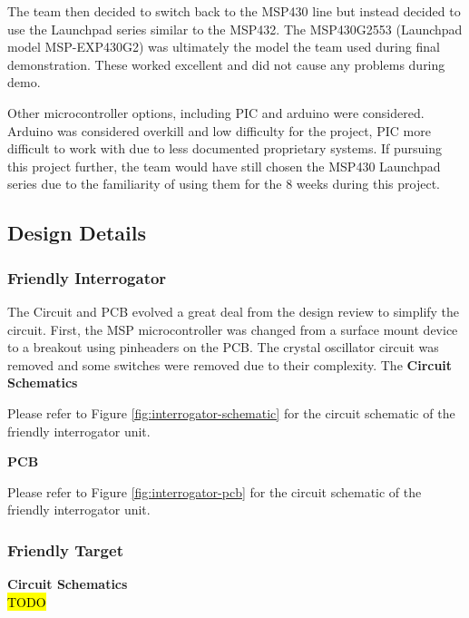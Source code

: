 \documentclass[letterpaper,10pt]{article}
\begin{document}
\begin{spacing}{1.15}
The team then decided to switch back to the MSP430 line but instead decided to use the Launchpad series similar to the MSP432. The MSP430G2553 (Launchpad model MSP-EXP430G2) was ultimately the model the team used during final demonstration. These worked excellent and did not cause any problems during demo. 

Other microcontroller options, including PIC and arduino were considered. Arduino was considered overkill and low difficulty for the project, PIC more difficult to work with due to less documented proprietary systems. If pursuing this project further, the team would have still chosen the MSP430 Launchpad series due to the familiarity of using them for the 8 weeks during this project.


\subsection{Design Details}


\subsubsection{Friendly Interrogator}
The Circuit and PCB evolved a great deal from the design review to simplify the circuit. First, the MSP microcontroller was changed from a surface mount device to a breakout using pinheaders on the PCB. The crystal oscillator circuit was removed and some switches were removed due to their complexity. The 
\hspace{5mm}\textbf{Circuit Schematics} \label{section:interrogator-circuit-schematics-design-details}

Please refer to Figure \ref{fig:interrogator-schematic} for the circuit schematic of the friendly interrogator unit. 

\hspace{5mm}\textbf{PCB} \label{section:interrogator-pcb-design-details}

Please refer to Figure \ref{fig:interrogator-pcb} for the circuit schematic of the friendly interrogator unit. 



\subsubsection{Friendly Target}
\hspace{5mm}\textbf{Circuit Schematics} \label{section:target-circuit-schematics-design-details}
\\ \hl{TODO}


\end{spacing}
\end{document}
